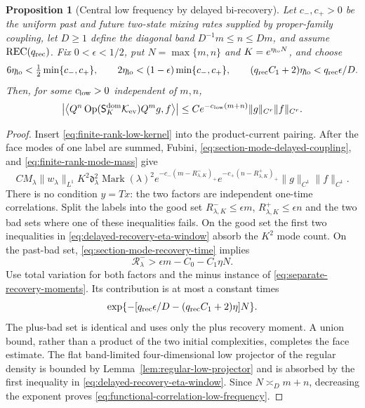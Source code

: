 \documentclass[11pt]{article}
\newtheorem{proposition}[theorem]{Proposition}
\begin{document}
\begin{proposition}[Central low frequency by delayed bi-recovery]
\label{prop:functional-correlation-low-frequency}
Let $c_-,c_+>0$ be the uniform past and future two-state mixing rates supplied
by proper-family coupling, let $D\ge1$ define the diagonal band
$D^{-1}m\le n\le Dm$, and assume $\mathrm{REC}(q_{\rm rec})$.  Fix
$0<\epsilon<1/2$, put $N=\max\{m,n\}$ and
$K=e^{\eta_{\rm lo}N}$, and choose
\begin{equation}
\label{eq:delayed-recovery-eta-window}
 6\eta_{\rm lo}<\tfrac12\min\{c_-,c_+\},\qquad
 2\eta_{\rm lo}<(1-\epsilon)\min\{c_-,c_+\},\qquad
 (q_{\rm rec}C_1+2)\eta_{\rm lo}<q_{\rm rec}\epsilon/D.
\end{equation}
Then, for some $c_{\rm low}>0$ independent of $m,n$,
\begin{equation}
\label{eq:functional-correlation-low-frequency}
 \left|\left\langle Q^n
 \operatorname{Op}(\mathsf S_K^{\rm dom}\mathcal K_{\rm ev})Q^mg,
 f\right\rangle\right|
 \le C e^{-c_{\rm low}(m+n)}\|g\|_{C^r}\|f\|_{C^r}.
\end{equation}
\end{proposition}

\begin{proof}
Insert \eqref{eq:finite-rank-low-kernel} into the product-current pairing.
After the face modes of one label are summed, Fubini,
\eqref{eq:section-mode-delayed-coupling}, and
\eqref{eq:finite-rank-mode-mass} give
\[
 C M_\lambda\|w_\lambda\|_{L^1}K^2\mathfrak d_\lambda^2
 \operatorname{Mark}(\lambda)^2
 e^{-c_-(m-R^-_{\lambda,K})_+}
 e^{-c_+(n-R^+_{\lambda,K})_+}
 \|g\|_{C^1}\|f\|_{C^1}.
\]
There is no condition $y=Tx$: the two factors are independent one-time
correlations.  Split the labels into the good set
$R^-_{\lambda,K}\le\epsilon m$, $R^+_{\lambda,K}\le\epsilon n$ and the two
bad sets where one of these inequalities fails.  On the good set the first
two inequalities in \eqref{eq:delayed-recovery-eta-window} absorb the
$K^2$ mode count.  On the past-bad set,
\eqref{eq:section-mode-recovery-time} implies
\[
 \mathcal R^-_\lambda>\epsilon m-C_0-C_1\eta N.
\]
Use total variation for both factors and the minus instance of
\eqref{eq:separate-recovery-moments}.  Its contribution is at most a constant
times
\[
 \exp\{-[q_{\rm rec}\epsilon/D-(q_{\rm rec}C_1+2)\eta]N\}.
\]
The plus-bad set is identical and uses only the plus recovery moment.  A
union bound, rather than a product of the two initial complexities, completes
the face estimate.  The flat band-limited four-dimensional low projector of the
regular density is bounded by Lemma~\ref{lem:regular-low-projector} and is absorbed by the
first inequality in \eqref{eq:delayed-recovery-eta-window}.  Since
$N\asymp_Dm+n$, decreasing the exponent proves
\eqref{eq:functional-correlation-low-frequency}.
\end{proof}
\end{document}
